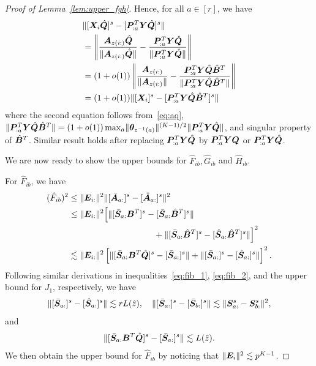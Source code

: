 \documentclass[journal]{IEEEtran}
\theoremstyle{definition}
\theoremstyle{definition}
\newcommand{\off}[1]{\left[#1\right]}
\begin{document}
\begin{proof}[Proof of Lemma~\ref{lem:upper_fgh}]
{Hence, for all $a \in [r]$, we have 
\begin{align}
    &\onormSize{}{ [\mX_i \hat \mQ]^s - [\mP_{:a}^T \mY \hat \mQ ]^s } \\
    &= \onorm{ \frac{\mA_{z(i:)} \hat \mQ  }{\onormSize{}{\mA_{z(i:)} \hat \mQ }} - \frac{\mP_{:a}^T \mY \hat \mQ  }{ \onormSize{}{\mP_{:a}^T \mY \hat \mQ} } } \\
    &= (1+o(1))  \onorm{ \frac{\mA_{z(i:)} }{\onormSize{}{\mA_{z(i:)} }} - \frac{\mP_{:a}^T \mY \hat \mQ \hat \mB^T  }{ \onormSize{}{\mP_{:a}^T \mY \hat \mQ \hat \mB^T} } } \\
    &= (1+o(1)) \onormSize{}{ [\mX_i]^s - [\mP_{:a}^T \mY \hat \mQ \hat \mB^T ]^s } \label{eq:angle_aq}
\end{align}
where the second equation follows from~\eqref{eq:aq}, $\lVert\bm{P}_{:a}^T \bm Y \hat {\bm{Q}} \hat {\bm B}^T\rVert = (1 + o(1)) \max_{a} \lVert\boldsymbol{\theta}_{z^{-1}(a)}\rVert^{(K-1)/2} \lVert\bm{P}_{:a}^T \bm Y \hat {\bm{Q}} \rVert $, and singular property of $\hat {\bm B}^T$. Similar result holds after replacing $\bm{P}_{:a}^T \bm Y \hat {\bm{Q}}$ by  $\bm{P}_{:a}^T \bm Y\bm{Q}$ or $\bm{P}_{:a}^T \bm Y \hat {\bm{Q}}$.

We are now ready to show the upper bounds for $\hat F_{ib},\hat G_{ib}$ and $\hat H_{ib}$.

 For $\hat F_{ib}$, we have 
\begin{align}
    (\hat F_{ib})^2 &\leq \onormSize{}{\mE_{i:}}^2 \onormSize{}{ [\bar  \mA_{a:}]^s - [\hat \mA_{a:}]^s }^2\\
    &\leq \onormSize{}{\mE_{i:}}^2  \Big[ \onormSize{}{ [ \bar \mS_{a:} \mB^T]^s - [\bar \mS_{a:} \hat \mB^T]^s } \\
    & \quad \quad \quad \quad \quad  \quad  \quad \quad \quad \quad +  \onormSize{}{ [ \bar \mS_{a:} \hat \mB^T]^s -  [\hat \mS_{a:} \hat \mB^T]^s}  \Big]^2 \\
    &\lesssim \onormSize{}{\mE_{i:}}^2  \off{ \onormSize{}{ [ \bar \mS_{a:} \mB^T \hat \mQ]^s - [\bar \mS_{a:}]^s } +  \onormSize{}{ [ \bar \mS_{a:} ]^s -  [ \hat \mS_{a:} ]^s}  }^2.
\end{align}
Following similar derivations in inequalities~\eqref{eq:fib_1}, \eqref{eq:fib_2}, and the upper bound for $J_{1}$, respectively, we have 
\begin{equation}
    \lVert [ \bar {\bm S}_{a:} ]^s -  [ \hat {\bm S}_{a:} ]^s\rVert  \lesssim r L(\hat z), \quad  \lVert [ \bar {\bm S}_{a:} ]^s -  [ \bar {\bm S}_{b:} ]^s\rVert \lesssim \lVert\bm S_{a:}^s - \bm S_{b:}^s\rVert^2, 
\end{equation}
and 
\begin{align}
    \lVert [ \bar {\bm S}_{a:} \bm B^T \hat {\bm{Q}}]^s - [\bar {\bm S}_{a:}]^s \rVert \lesssim L(\hat z).
\end{align}
We then obtain the upper bound for $\hat F_{ib}$ by noticing that $\lVert\bm{E}_i\rVert^2 \lesssim p^{K-1}$.

}
\end{proof}
\end{document}
